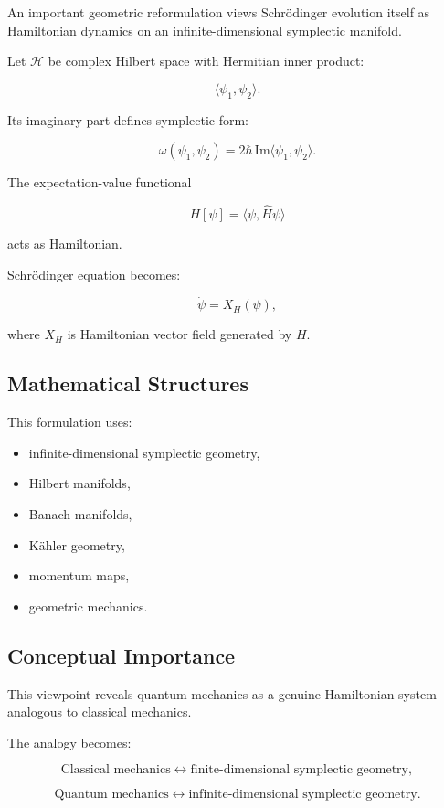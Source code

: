 \documentclass[11pt]{article}
\begin{document}
An important geometric reformulation views Schr\"odinger evolution itself as Hamiltonian dynamics on an infinite-dimensional symplectic manifold.

Let $\mathcal H$ be complex Hilbert space with Hermitian inner product:

\[
\langle \psi_1,\psi_2\rangle .
\]

Its imaginary part defines symplectic form:

\[
\omega(\psi_1,\psi_2)
=
2\hbar
\,\mathrm{Im}
\langle \psi_1,\psi_2\rangle .
\]

The expectation-value functional

\[
H[\psi]
=
\langle \psi,\hat H\psi\rangle
\]

acts as Hamiltonian.

Schr\"odinger equation becomes:

\[
\dot\psi
=
X_H(\psi),
\]

where $X_H$ is Hamiltonian vector field generated by $H$.

\subsection{Mathematical Structures}

This formulation uses:

\begin{itemize}
\item infinite-dimensional symplectic geometry,
\item Hilbert manifolds,
\item Banach manifolds,
\item K\"ahler geometry,
\item momentum maps,
\item geometric mechanics.
\end{itemize}

\subsection{Conceptual Importance}

This viewpoint reveals quantum mechanics as a genuine Hamiltonian system analogous to classical mechanics.

The analogy becomes:

\[
\text{Classical mechanics}
\leftrightarrow
\text{finite-dimensional symplectic geometry},
\]

\[
\text{Quantum mechanics}
\leftrightarrow
\text{infinite-dimensional symplectic geometry}.
\]
\end{document}
